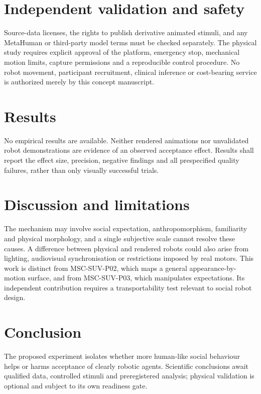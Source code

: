 \documentclass[11pt,a4paper]{article}
\begin{document}
\section{Independent validation and safety}
Source-data licenses, the rights to publish derivative animated stimuli, and any MetaHuman or third-party model terms must be checked separately. The physical study requires explicit approval of the platform, emergency stop, mechanical motion limits, capture permissions and a reproducible control procedure. No robot movement, participant recruitment, clinical inference or cost-bearing service is authorized merely by this concept manuscript.

\section{Results}
No empirical results are available. Neither rendered animations nor unvalidated robot demonstrations are evidence of an observed acceptance effect. Results shall report the effect size, precision, negative findings and all prespecified quality failures, rather than only visually successful trials.

\section{Discussion and limitations}
The mechanism may involve social expectation, anthropomorphism, familiarity and physical morphology, and a single subjective scale cannot resolve these causes. A difference between physical and rendered robots could also arise from lighting, audiovisual synchronisation or restrictions imposed by real motors. This work is distinct from MSC-SUV-P02, which maps a general appearance-by-motion surface, and from MSC-SUV-P03, which manipulates expectations. Its independent contribution requires a transportability test relevant to social robot design.

\section{Conclusion}
The proposed experiment isolates whether more human-like social behaviour helps or harms acceptance of clearly robotic agents. Scientific conclusions await qualified data, controlled stimuli and preregistered analysis; physical validation is optional and subject to its own readiness gate.
\end{document}
